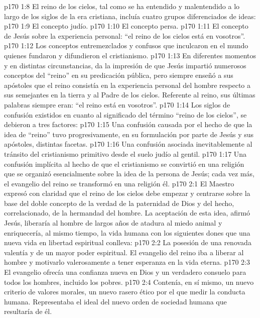 \vs p170 1:8 El reino de los cielos, tal como se ha entendido y malentendido a lo largo de los siglos de la era cristiana, incluía cuatro grupos diferenciados de ideas:
\vs p170 1:9 El concepto judío.
\vs p170 1:10 El concepto persa.
\vs p170 1:11 El concepto de Jesús sobre la experiencia personal: “el reino de los cielos está en vosotros”.
\vs p170 1:12 Los conceptos entremezclados y confusos que inculcaron en el mundo quienes fundaron y difundieron el cristianismo.
\vs p170 1:13 \pc En diferentes momentos y en distintas circunstancias, da la impresión de que Jesús impartió numerosos conceptos del “reino” en su predicación pública, pero siempre enseñó a sus apóstoles que el reino consistía en la experiencia personal del hombre respecto a sus semejantes en la tierra y al Padre de los cielos. Referente al reino, sus últimas palabras siempre eran: “el reino está en vosotros”.
\vs p170 1:14 Los siglos de confusión existidos en cuanto al significado del término “reino de los cielos”, se debieron a tres factores:
\vs p170 1:15 Una confusión causada por el hecho de que la idea de “reino” tuvo progresivamente, en su formulación por parte de Jesús y sus apóstoles, distintas facetas.
\vs p170 1:16 Una confusión asociada inevitablemente al tránsito del cristianismo primitivo desde el suelo judío al gentil.
\vs p170 1:17 Una confusión implícita al hecho de que el cristianismo se convirtió en una religión que se organizó esencialmente sobre la idea de la persona de Jesús; cada vez más, el evangelio del reino se transformó en una religión  él.
\vs p170 2:1 El Maestro expresó con claridad que el reino de los cielos debe empezar y centrarse sobre la base del doble concepto de la verdad de la paternidad de Dios y del hecho, correlacionado, de la hermandad del hombre. La aceptación de esta idea, afirmó Jesús, liberaría al hombre de largos años de atadura al miedo animal y enriquecería, al mismo tiempo, la vida humana con los siguientes dones que una nueva vida en libertad espiritual conlleva:
\vs p170 2:2 La posesión de una renovada valentía y de un mayor poder espiritual. El evangelio del reino iba a liberar al hombre y motivarlo valerosamente a tener esperanza en la vida eterna.
\vs p170 2:3 El evangelio ofrecía una confianza nueva en Dios y un verdadero consuelo para todos los hombres, incluido los pobres.
\vs p170 2:4 Contenía, en sí mismo, un nuevo criterio de valores morales, un nuevo rasero ético por el que medir la conducta humana. Representaba el ideal del nuevo orden de sociedad humana que resultaría de él.
